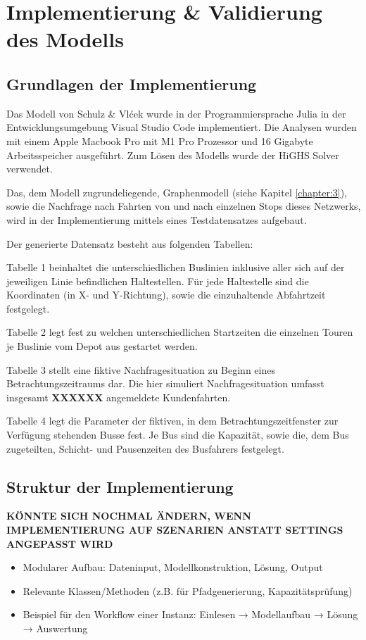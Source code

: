 \chapter{Implementierung \& Validierung des Modells}
\label{chapter:5}
\section{Grundlagen der Implementierung}
Das Modell von Schulz \& Vlćek wurde in der Programmiersprache Julia in der Entwicklungsumgebung Visual Studio Code implementiert. Die Analysen wurden mit einem Apple Macbook Pro mit M1 Pro Prozessor und 16 Gigabyte Arbeitsspeicher ausgeführt. Zum Lösen des Modells wurde der HiGHS Solver verwendet. 

Das, dem Modell zugrundeliegende, Graphenmodell (siehe Kapitel \ref{chapter:3}), sowie die Nachfrage nach Fahrten von und nach einzelnen Stops dieses Netzwerks, wird in der Implementierung mittels eines Testdatensatzes aufgebaut. %

Der generierte Datensatz besteht aus folgenden Tabellen:

Tabelle 1 beinhaltet die unterschiedlichen Buslinien inklusive aller sich auf der jeweiligen Linie befindlichen Haltestellen. Für jede Haltestelle sind die Koordinaten (in X- und Y-Richtung), sowie die einzuhaltende Abfahrtzeit festgelegt. 

Tabelle 2 legt fest zu welchen unterschiedlichen Startzeiten die einzelnen Touren je Buslinie vom Depot aus gestartet werden. 

Tabelle 3 stellt eine fiktive Nachfragesituation zu Beginn eines Betrachtungszeitraums dar. Die hier simuliert Nachfragesituation umfasst insgesamt \textbf{XXXXXX} angemeldete Kundenfahrten. 

Tabelle 4 legt die Parameter der fiktiven, in dem Betrachtungszeitfenster zur Verfügung stehenden Busse fest. Je Bus sind die Kapazität, sowie die, dem Bus zugeteilten, Schicht- und Pausenzeiten des Busfahrers festgelegt.

\section{Struktur der Implementierung}
\textbf{KÖNNTE SICH NOCHMAL ÄNDERN, WENN IMPLEMENTIERUNG AUF SZENARIEN ANSTATT SETTINGS ANGEPASST WIRD}
\begin{itemize}
    \item Modularer Aufbau: Dateninput, Modellkonstruktion, Lösung, Output
    \item Relevante Klassen/Methoden (z.B. für Pfadgenerierung, Kapazitätsprüfung)
    \item Beispiel für den Workflow einer Instanz: Einlesen → Modellaufbau → Lösung → Auswertung
\end{itemize}

